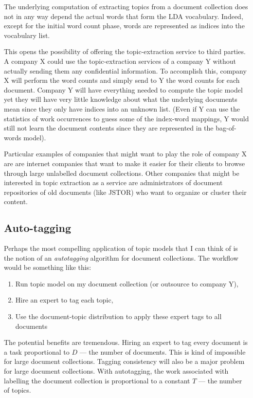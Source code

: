 \documentclass[letterpaper,11pt]{article}
\begin{document}
		The underlying computation of extracting topics from a document collection does not
		in any way depend the actual words that form the LDA vocabulary.
		Indeed, except for the initial word count phase, words are represented as indices into
		the vocabulary list.
		
		This opens the possibility of offering the topic-extraction service to third parties.
		A company X could use the topic-extraction services of a company Y without actually
		sending them any confidential information.
		To accomplish this, company X will perform the word counts and simply send to
		Y the word counts for each document.
		Company Y will have everything needed to compute the topic model yet they will have
		very little knowledge about what the underlying documents mean since they only have 
		indices into an unknown list.
		(Even if Y can use the statistics of work occurrences to guess some of the index-word mappings,
		 Y would still not learn the document contents since they are represented in the bag-of-words model).
		 
		 Particular examples of companies that might want to play the role of company X are 
		 are internet companies that want to make it easier for their clients to browse through
		 large unlabelled document collections.
		 Other companies that might be interested in topic extraction as a service are 
		 administrators of document repositories of old documents (like JSTOR) 
		 who want to organize or cluster their content.
		 
		 

	\subsection{Auto-tagging}

		Perhaps the most compelling application of topic models that I can think of is
		the notion of an \emph{autotagging} algorithm for document collections. 
		The workflow would be something like this:
		\begin{enumerate}
			\item 	Run topic model on my document collection (or outsource to company Y),
			\item		Hire an expert to tag each topic,
			\item		Use the document-topic distribution to apply these expert tags to all documents
		\end{enumerate}
		
		The potential benefits are tremendous. Hiring an expert to tag every document is 
		a task proportional to $D$ --- the number of documents.
		This is kind of impossible for large document collections. 
		Tagging consistency will also be a major problem for large document collections.
		With autotagging, the work associated with labelling the document collection is 
		proportional to a constant $T$ --- the number of topics.
		
\end{document}
